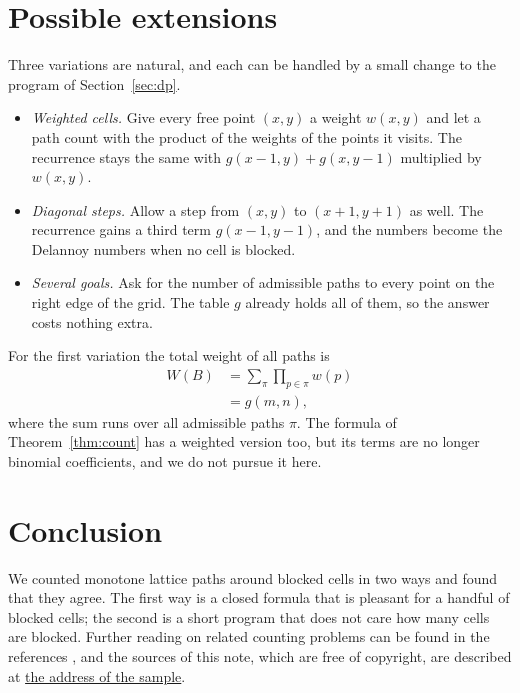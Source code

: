 \documentclass[11pt]{article}
\theoremstyle{definition}
\begin{document}
\section{Possible extensions}
\label{sec:extensions}

Three variations are natural, and each can be handled by a small change to the program of Section~\ref{sec:dp}.
\begin{itemize}
  \item \emph{Weighted cells.} Give every free point $(x,y)$ a weight $w(x,y)$ and let a path count with the product of the weights of the points it visits. The recurrence stays the same with $g(x-1,y)+g(x,y-1)$ multiplied by $w(x,y)$.
  \item \emph{Diagonal steps.} Allow a step from $(x,y)$ to $(x+1,y+1)$ as well. The recurrence gains a third term $g(x-1,y-1)$, and the numbers become the Delannoy numbers when no cell is blocked.
  \item \emph{Several goals.} Ask for the number of admissible paths to every point on the right edge of the grid. The table $g$ already holds all of them, so the answer costs nothing extra.
\end{itemize}
For the first variation the total weight of all paths is
\begin{align}
  W(B) &= \sum_{\pi} \prod_{p\in\pi} w(p) \label{eq:weight}\\
       &= g(m,n), \nonumber
\end{align}
where the sum runs over all admissible paths $\pi$. The formula of Theorem~\ref{thm:count} has a weighted version too, but its terms are no longer binomial coefficients, and we do not pursue it here.

\section{Conclusion}
\label{sec:conclusion}

We counted monotone lattice paths around blocked cells in two ways and found that they agree. The first way is a closed formula that is pleasant for a handful of blocked cells; the second is a short program that does not care how many cells are blocked. Further reading on related counting problems can be found in the references \cite{knuth,stanley}, and the sources of this note, which are free of copyright, are described at \href{https://example.invalid/sample-1}{the address of the sample}.



\end{document}
